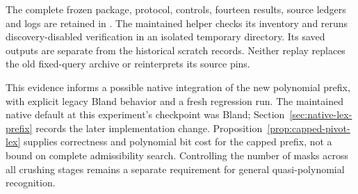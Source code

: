 The complete frozen package, protocol, controls, fourteen results, source
ledgers and logs are retained in
.
The maintained helper  checks its
inventory and reruns discovery-disabled verification in an isolated temporary
directory.  Its saved outputs are separate from the historical scratch
records.  Neither replay replaces the old fixed-query archive or reinterprets
its source pins.

This evidence informs a possible native integration of the new polynomial
prefix, with explicit legacy Bland behavior and a fresh regression run.
The maintained native default at this experiment's checkpoint was Bland;
Section~\ref{sec:native-lex-prefix} records the later implementation change.
Proposition~\ref{prop:capped-pivot-lex} supplies correctness and polynomial
bit cost for the capped prefix, not a bound on complete admissibility search.
Controlling the number of masks across all crushing stages remains a separate
requirement for general quasi-polynomial recognition.
